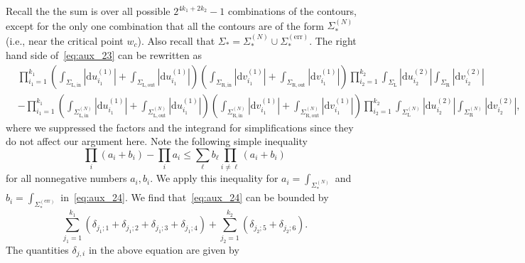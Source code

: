 \documentclass{article}
\numberwithin{equation}{section}
\newcommand{\exe}{\mathrm{err}}
\newcommand{\inn}{\mathrm{in}}
\newcommand{\LL}{\mathrm{L}}
\newcommand{\out}{\mathrm{out}}
\newcommand{\RR}{\mathrm{R}}
\begin{document}
Recall the the sum is over all possible $2^{4k_1+2k_2}-1$ combinations of the contours, except for the only one combination that all the contours are of the form $\Sigma_*^{(N)}$ (i.e., near the critical point $w_c$). Also recall that $\Sigma_*=\Sigma_*^{(N)}\cup\Sigma_*^{(\exe)}$. The right hand side of~\eqref{eq:aux_23} can be rewritten as
\begin{equation}
	\label{eq:aux_24}
	\begin{split}
	&\prod_{i_1=1}^{k_1}\left(  \int_{\Sigma_{\LL,\inn}}|\mathrm{d}u^{(1)}_{i_1}|
	+\int_{\Sigma_{\LL,\out}}|\mathrm{d}u^{(1)}_{i_1}|
	\right)
	\left( \int_{\Sigma_{\RR,\inn}}  |\mathrm{d}v^{(1)}_{i_1}|
	+ \int_{\Sigma_{\RR,\out}}|\mathrm{d}v^{(1)}_{i_1}|
	\right)\prod_{i_2=1}^{k_2}  
	\int_{\Sigma_\LL} |\mathrm{d}u^{(2)}_{i_2}| 
	\int_{\Sigma_\RR} |\mathrm{d}v^{(2)}_{i_2}|\\
	&-\prod_{i_1=1}^{k_1}\left(  \int_{\Sigma_{\LL,\inn}^{(N)}}|\mathrm{d}u^{(1)}_{i_1}|
	+\int_{\Sigma_{\LL,\out}^{(N)}}|\mathrm{d}u^{(1)}_{i_1}|
	\right)
	\left( \int_{\Sigma_{\RR,\inn}^{(N)}}   |\mathrm{d}v^{(1)}_{i_1}|
	+ \int_{\Sigma_{\RR,\out}^{(N)}}|\mathrm{d}v^{(1)}_{i_1}|   
	\right)\prod_{i_2=1}^{k_2}  
	\int_{\Sigma_\LL^{(N)}} |\mathrm{d}u^{(2)}_{i_2}| 
	\int_{\Sigma_\RR^{(N)}} |\mathrm{d}v^{(2)}_{i_2}|,
	\end{split}
\end{equation}
where we suppressed the factors and the integrand for simplifications since they do not affect our argument here. Note the following simple inequality
\begin{equation*}
	\prod_{i} (a_i+b_i) -\prod_{i}a_i \le \sum_\ell b_\ell\prod_{i\ne \ell}(a_i+b_i)
\end{equation*}
for all nonnegative numbers $a_i,b_i$. We apply this inequality for $a_i=\int_{\Sigma_*^{(N)}}$ and $b_i=\int_{\Sigma_*^{(\exe)}}$ in~\eqref{eq:aux_24}. We find that~\eqref{eq:aux_24} can be bounded by
\begin{equation}
	\sum_{j_1=1}^{k_1}\left(\delta_{j_1;1}+\delta_{j_1;2}+\delta_{j_1;3}+\delta_{j_1;4}\right)+
	\sum_{j_2=1}^{k_2}\left(\delta_{j_2;5} +\delta_{j_2;6}\right).
\end{equation}
The quantities $\delta_{j,i}$ in the above equation are given by
\end{document}
